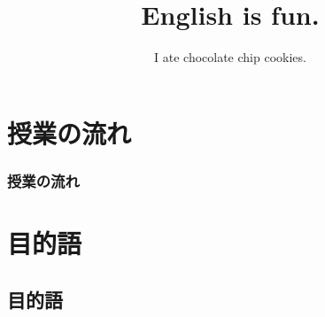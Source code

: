\documentclass[aspectratio=169,xcolor={dvipsnames,table}]{beamer}
\title{English is fun.}
\subtitle{I ate chocolate chip cookies.}
\author{}
\institute[]{}
\date[]
\begin{document}
\begin{frame}[plain]
  \titlepage
\end{frame}

\section*{授業の流れ}
\begin{frame}[plain]
  \frametitle{授業の流れ}
  \tableofcontents
\end{frame}

\section{目的語}
\subsection{目的語}
\end{document}
